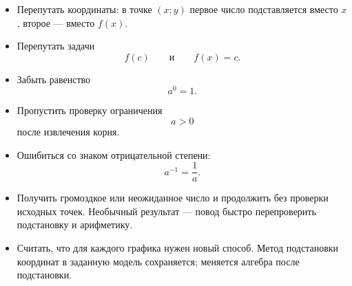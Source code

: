 \documentclass[a4paper,12pt]{article}
\begin{document}
\begin{itemize}

  \item
  Перепутать координаты:
  в точке $(x;y)$ первое число подставляется вместо $x$,
  второе --- вместо $f(x)$.

  \item
  Перепутать задачи
  \[
      f(c)
      \qquad\text{и}\qquad
      f(x)=c.
  \]

  \item
  Забыть равенство
  \[
      a^0=1.
  \]

  \item
  Пропустить проверку ограничения
  \[
      a>0
  \]
  после извлечения корня.

  \item
  Ошибиться со знаком отрицательной степени:
  \[
      a^{-1}=\frac1a.
  \]

  \item
  Получить громоздкое или неожиданное число
  и продолжить без проверки исходных точек.
  Необычный результат --- повод быстро перепроверить
  подстановку и арифметику.

  \item
  Считать, что для каждого графика нужен новый способ.
  Метод подстановки координат в заданную модель сохраняется;
  меняется алгебра после подстановки.

\end{itemize}


\clearpage

\thispagestyle{fancy}
\end{document}
